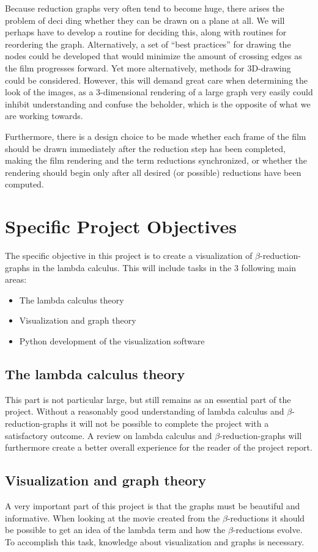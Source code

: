 \documentclass[11pt,oneside,a4paper]{article}
\begin{document}
Because reduction graphs very often tend to become huge, there arises the problem of deci	ding whether they can be drawn on a plane at all. We will perhaps have to develop a routine for deciding this, along with routines for reordering the graph. Alternatively, a set of ``best practices'' for drawing the nodes could be developed that would minimize the amount of crossing edges as the film progresses forward. Yet more alternatively, methods for 3D-drawing could be considered. However, this will demand great care when determining the look of the images, as a 3-dimensional rendering of a large graph very easily could inhibit understanding and confuse the beholder, which is the opposite of what we are working towards.

Furthermore, there is a design choice to be made whether each frame of the film should be drawn immediately after the reduction step has been completed, making the film rendering and the term reductions synchronized, or whether the rendering should begin only after all desired (or possible) reductions have been computed.

\section{Specific Project Objectives}
The specific objective in this project is to create a visualization of $\beta$-reduction-graphs in the lambda calculus. This will include tasks in the 3 following main areas:
\begin{itemize}
	\item The lambda calculus theory
	\item Visualization and graph theory
	\item Python development of the visualization software
\end{itemize}

\subsection{The lambda calculus theory}
This part is not particular large, but still remains as an essential part of the project. Without a reasonably good understanding of lambda calculus and $\beta$-reduction-graphs it will not be possible to complete the project with a satisfactory outcome. A review on lambda calculus and $\beta$-reduction-graphs will furthermore create a better overall experience for the reader of the project report.

\subsection{Visualization and graph theory}
A very important part of this project is that the graphs must be beautiful and informative. When looking at the movie created from the $\beta$-reductions it should be possible to get an idea of the lambda term and how the $\beta$-reductions evolve. To accomplish this task, knowledge about visualization and graphs is necessary.
\end{document}
